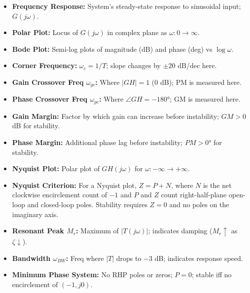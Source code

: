 \documentclass[12pt,a4paper]{article}
\begin{document}
\vspace{5pt}

\begin{tcolorbox}[defbox, title={\textbf{One-Line Definitions}}, title after break={One-Line Definitions (contd.)}]
\begin{itemize}[leftmargin=*, itemsep=3pt, topsep=0pt]
  \item \textbf{Frequency Response:} System's steady-state response to sinusoidal input; $G(j\omega)$.
  \item \textbf{Polar Plot:} Locus of $G(j\omega)$ in complex plane as $\omega: 0\to\infty$.
  \item \textbf{Bode Plot:} Semi-log plots of magnitude (dB) and phase (deg) vs $\log\omega$.
  \item \textbf{Corner Frequency:} $\omega_c = 1/T$; slope changes by $\pm20$ dB/dec here.
  \item \textbf{Gain Crossover Freq $\omega_{gc}$:} Where $|GH|=1$ (0 dB); PM is measured here.
  \item \textbf{Phase Crossover Freq $\omega_{pc}$:} Where $\angle GH = -180°$; GM is measured here.
  \item \textbf{Gain Margin:} Factor by which gain can increase before instability; $GM > 0$ dB for stability.
  \item \textbf{Phase Margin:} Additional phase lag before instability; $PM > 0°$ for stability.
  \item \textbf{Nyquist Plot:} Polar plot of $GH(j\omega)$ for $\omega: -\infty\to+\infty$.
  \item \textbf{Nyquist Criterion:} For a Nyquist plot, $Z=P+N$, where $N$ is the net clockwise encirclement count of $-1$ and $P$ and $Z$ count right-half-plane open-loop and closed-loop poles. Stability requires $Z=0$ and no poles on the imaginary axis.
  \item \textbf{Resonant Peak $M_r$:} Maximum of $|T(j\omega)|$; indicates damping ($M_r\uparrow$ as $\zeta\downarrow$).
  \item \textbf{Bandwidth $\omega_{BW}$:} Freq where $|T|$ drops to $-3$ dB; indicates response speed.
  \item \textbf{Minimum Phase System:} No RHP poles or zeros; $P=0$; stable iff no encirclement of $(-1,j0)$.
\end{itemize}
\end{tcolorbox}

\vspace{5pt}
\end{document}
